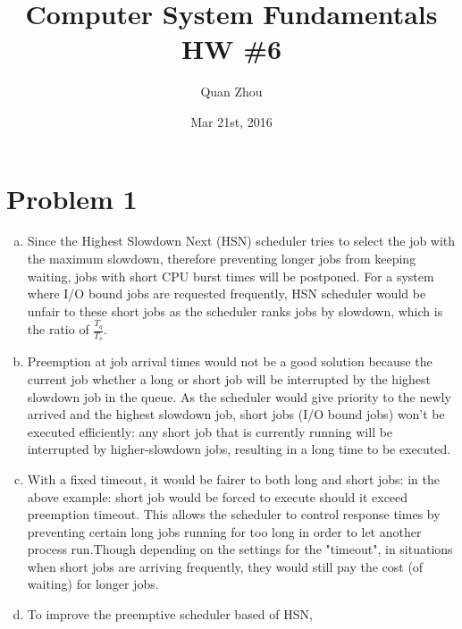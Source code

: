 \documentclass{article}   	                         %
\title{Computer System Fundamentals HW \#6}
\author{Quan Zhou}
\date{Mar 21st, 2016}
\begin{document}
\maketitle
\section*{Problem 1}
\begin{enumerate}[(a)]
\item
Since the Highest Slowdown Next (HSN) scheduler tries to select the job with the maximum slowdown, therefore preventing longer jobs from keeping waiting, jobs with short CPU burst times will be postponed. For a system where I/O bound jobs are requested frequently, HSN scheduler would be unfair to these short jobs as the scheduler ranks jobs by slowdown, which is the ratio of $\frac{T_q}{T_s}$. 
\item
Preemption at job arrival times would not be a good solution because the current job whether a long or short job will be interrupted by the highest slowdown job in the queue. As the scheduler would give priority to the newly arrived and the highest slowdown job, short jobs (I/O bound jobs) won't be executed efficiently: any short job that is currently running will be interrupted by higher-slowdown jobs, resulting in a long time to be executed.
\item
With a fixed timeout, it would be fairer to both long and short jobs: in the above example: short job would be forced to execute should it exceed preemption timeout. This allows the scheduler to control response times by preventing certain long jobs running for too long in order to let another process run.Though depending on the settings for the "timeout",  in situations when short jobs are arriving frequently, they would still pay the cost (of waiting) for longer jobs.
\item
To improve the preemptive scheduler based of HSN,
\end{enumerate}
\end{document}
